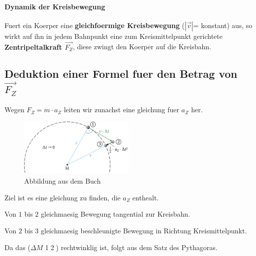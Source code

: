 \documentclass{report}
\begin{document}
\paragraph{Dynamik der Kreisbewegung}
Fuert ein Koerper eine \textbf{gleichfoermige Kreisbewegung} ($|\vec{v}|$=
konstant) aus, so wirkt auf ihn in jedem Bahnpunkt eine zum Kreismittelpunkt
gerichtete \textbf{Zentripeltalkraft $\vec{F_Z}$}, diese zwingt den Koerper auf
die Kreisbahn. 

\clearpage

\subsection{Deduktion einer Formel fuer den Betrag von $\vec{F_Z}$}
Wegen $F_Z = m \cdot a_Z$ leiten wir zunachst eine gleichung fuer $a_Z$ her.

\begin{figure}[htpb]
  \begin{center}
    \includegraphics[width=0.5\textwidth]{./physic-figures/kreisbewegung.jpg}
  \end{center}
  \caption{Abbildung aus dem Buch}
\end{figure}


Ziel ist es eine gleichung zu finden, die $a_Z$ enthealt. 

Von $1$ bis $2$ gleichmaesig Bewegung tangential zur Kreisbahn.

Von $2$ bis $3$ gleichmaesig beschleunigte Bewegung in Richtung Kreismittelpunkt.

Da das ($\Delta M$ \textcircled{1}\textcircled{2}) rechtwinklig ist, folgt aus dem Satz des Pythagoras.
\end{document}
